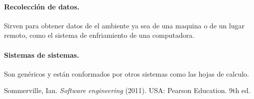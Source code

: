 \documentclass[spanish,12pt,letterpapper]{article}
\begin{document}
	\paragraph{Recolección de datos.} Sirven para obtener datos de el ambiente ya sea de una maquina o de un lugar remoto, como el sistema de enfriamiento de una computadora.
	
	\paragraph{Sistemas de sistemas.} Son genéricos y están conformados por otros sistemas como las hojas de calculo.
	
	\pagebreak
	\begin{thebibliography}{9}
		  Sommerville, Ian. 
		\emph{Software engineering} (2011). USA:  Pearson Education. 9th ed. 
		
	\end{thebibliography}
	
	
	
	
\end{document}
